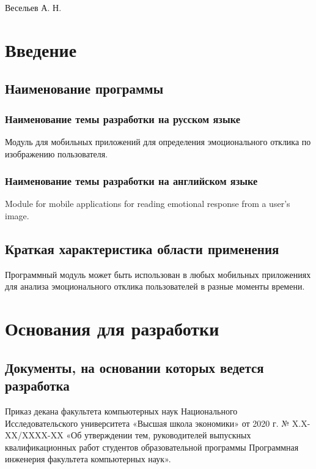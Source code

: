 \documentclass[a4paper,12pt,reqno]{article}
\begin{document}
    {Весельев А. Н.}

    \firstPage

    \newpage
    \secondPage

    \newpage
    \thirdPage

    \newpage
    \section{Введение}
    \subsection{Наименование программы}
    \subsubsection{Наименование темы разработки на русском языке}
    Модуль для мобильных приложений для определения эмоционального отклика по изображению пользователя.
    \subsubsection{Наименование темы разработки на английском языке}
    Module for mobile applications for reading emotional response from a user's image.
    \subsection{Краткая характеристика области применения}
    Программный модуль может быть использован в любых мобильных приложениях для анализа эмоционального отклика пользователей в разные моменты времени.

    \newpage
    \section{Основания для разработки}
    \subsection{Документы, на основании которых ведется разработка}
    Приказ декана факультета компьютерных наук Национального Исследовательского университета «Высшая школа экономики» от 2020 г. № X.X-XX/XXXX-XX «Об утверждении тем, руководителей выпускных квалификационных работ студентов образовательной программы Программная инженерия факультета компьютерных наук».
\end{document}
